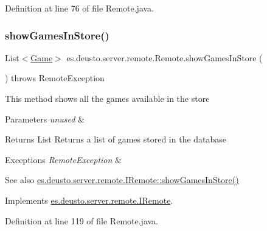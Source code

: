 Definition at line 76 of file Remote.\+java.

\mbox{\label{classes_1_1deusto_1_1server_1_1remote_1_1_remote_ae40a5882d6b3ef3d5928d87dafeb15fa}} 
\subsubsection{\texorpdfstring{show\+Games\+In\+Store()}{showGamesInStore()}}
{\footnotesize\ttfamily List$<$\hyperlink{classes_1_1deusto_1_1server_1_1db_1_1data_1_1_game}{Game}$>$ es.\+deusto.\+server.\+remote.\+Remote.\+show\+Games\+In\+Store (\begin{DoxyParamCaption}{ }\end{DoxyParamCaption}) throws Remote\+Exception}

This method shows all the games available in the store 
\begin{DoxyParams}{Parameters}
{\em unused} & \\
\hline
\end{DoxyParams}
\begin{DoxyReturn}{Returns}
List Returns a list of games stored in the database 
\end{DoxyReturn}

\begin{DoxyExceptions}{Exceptions}
{\em Remote\+Exception} & \\
\hline
\end{DoxyExceptions}
\begin{DoxySeeAlso}{See also}
\hyperlink{interfacees_1_1deusto_1_1server_1_1remote_1_1_i_remote_a091249da31b567c1be29e07085d3ff18}{es.\+deusto.\+server.\+remote.\+I\+Remote\+::show\+Games\+In\+Store()} 
\end{DoxySeeAlso}


Implements \hyperlink{interfacees_1_1deusto_1_1server_1_1remote_1_1_i_remote_a091249da31b567c1be29e07085d3ff18}{es.\+deusto.\+server.\+remote.\+I\+Remote}.



Definition at line 119 of file Remote.\+java.

\mbox{\label{classes_1_1deusto_1_1server_1_1remote_1_1_remote_a73569877f9317fc48a4e134977baa304}} 
